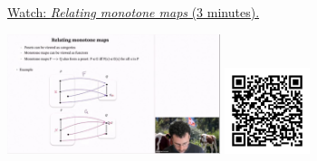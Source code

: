 
\begin{minipage}{10cm}
    \href{https://act4e-spring21.netlify.app/videos/spring2021-nat-trafos:natural-trafos:rel-mon-maps.html}{Watch: \emph{Relating monotone maps} (3 minutes).}
        
    \href{https://act4e-spring21.netlify.app/videos/spring2021-nat-trafos:natural-trafos:rel-mon-maps.html}{\includegraphics[height=3.5cm]{spring2021-nat-trafos:natural-trafos:rel-mon-maps/thumbnails.jpg}}
    \href{https://act4e-spring21.netlify.app/videos/spring2021-nat-trafos:natural-trafos:rel-mon-maps.html}{\includegraphics[height=2.5cm]{spring2021-nat-trafos:natural-trafos:rel-mon-maps/qrcode.png}}
\end{minipage}
